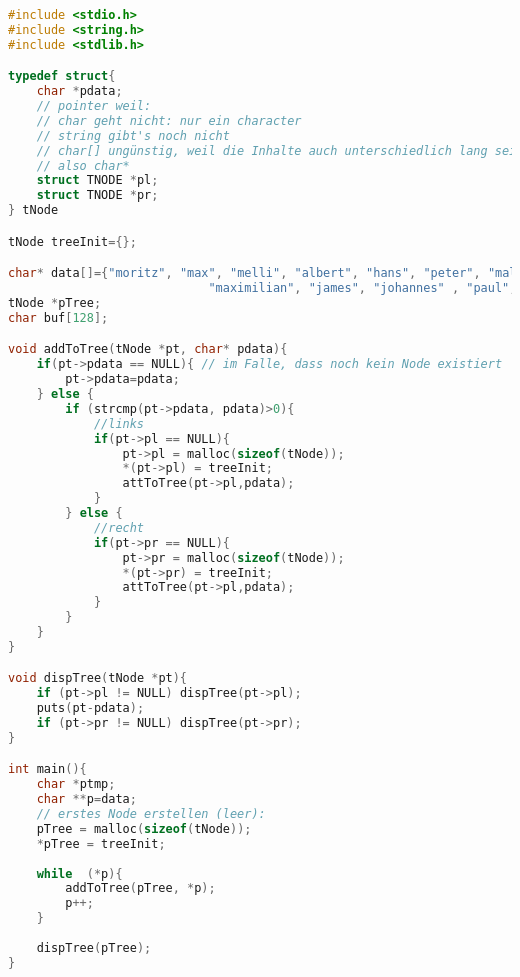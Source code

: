 \begin{lstlisting}[language=C]
#include <stdio.h>
#include <string.h>
#include <stdlib.h>

typedef struct{
	char *pdata;
	// pointer weil: 
	// char geht nicht: nur ein character
	// string gibt's noch nicht
	// char[] ungünstig, weil die Inhalte auch unterschiedlich lang seien könnten.
	// also char*
	struct TNODE *pl;
	struct TNODE *pr;
} tNode

tNode treeInit={};

char* data[]={"moritz", "max", "melli", "albert", "hans", "peter", "malte",
							"maximilian", "james", "johannes" , "paul",  NULL);
tNode *pTree;
char buf[128];

void addToTree(tNode *pt, char* pdata){
	if(pt->pdata == NULL){ // im Falle, dass noch kein Node existiert
		pt->pdata=pdata;
	} else {
		if (strcmp(pt->pdata, pdata)>0){
			//links
			if(pt->pl == NULL){
				pt->pl = malloc(sizeof(tNode));
				*(pt->pl) = treeInit;
				attToTree(pt->pl,pdata);
			}
		} else {
			//recht
			if(pt->pr == NULL){
				pt->pr = malloc(sizeof(tNode));
				*(pt->pr) = treeInit;
				attToTree(pt->pl,pdata);
			}
		}
	}
}

void dispTree(tNode *pt){
	if (pt->pl != NULL) dispTree(pt->pl);
	puts(pt-pdata);
	if (pt->pr != NULL) dispTree(pt->pr);
}

int main(){
	char *ptmp;
	char **p=data;
	// erstes Node erstellen (leer):
	pTree = malloc(sizeof(tNode));
	*pTree = treeInit;
	
	while  (*p){
		addToTree(pTree, *p); 
		p++;
	}
	
	dispTree(pTree);
}
\end{lstlisting}

